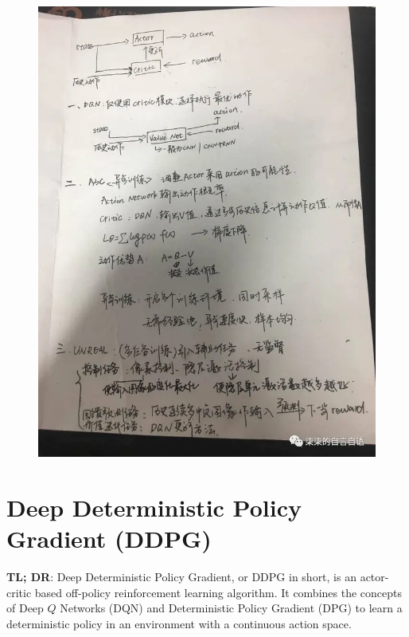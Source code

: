 \begin{figure}[h]
\centering
\includegraphics[scale=0.118]{pix/td3/2.png}
\end{figure}

\section{Deep Deterministic Policy Gradient (DDPG)}


{\bf TL; DR}: Deep Deterministic Policy Gradient, or DDPG in short, is an 
actor-critic based off-policy reinforcement learning algorithm. It combines 
the concepts of Deep $Q$ Networks (DQN) and Deterministic Policy Gradient (DPG) 
to learn a deterministic policy in an environment with a continuous action space.

